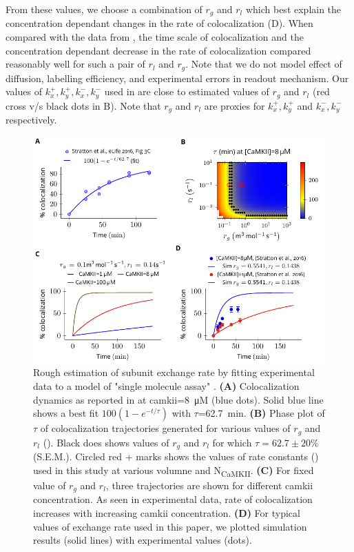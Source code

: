 \documentclass[9pt,lineno,doublespacing]{elife}
\newcommand\SUB[2]{#1\textsubscript{#2}}
\begin{document}
From these values, we choose a combination of $r_g$ and $r_l$ which best explain
the concentration dependant changes in the rate of colocalization
(D).  When compared with the data from
\cite{stratton_activation-triggered_2014}, the time scale of colocalization and
the concentration dependant decrease in the rate of colocalization compared
reasonably well for such a pair of $r_l$ and $r_g$. Note that we do not model
effect of diffusion, labelling efficiency, and experimental errors in readout
mechanism.  Our values of $k_x^+, k_y^+, k_x^-, k_y^-$ used in 
are close to estimated values of $r_g$ and $r_l$ (red cross v/s black dots in
B). Note that $r_g$ and $r_l$ are proxies for
$k_x^+,k_y^+$ and $k_x^-, k_y^-$ respectively.

\begin{figure}[ht!]
    \includegraphics[width=0.95\linewidth]{./PaperFigures/elifeFigure8/figure_exchange_rate.pdf}
    \caption{Rough estimation of subunit exchange rate by fitting experimental
        data to a model of "single molecule assay" \cite{stratton_activation-triggered_2014}. 
        \textbf{(A)} Colocalization
        dynamics as reported in \cite{stratton_activation-triggered_2014} at
        \gls{camkii}=\SI{8}{\micro M} (blue dots). Solid blue line shows a best
        fit $100(1-e^{-t/\tau})$ with $\tau$=\SI{62.7}{min}. \textbf{(B)} Phase
        plot of $\tau$ of colocalization trajectories generated for various
        values of $r_g$ and $r_l$ (). Black does shows values
        of $r_g$ and $r_l$ for which $\tau=62.7\pm 20\%$ (S.E.M.). Circled red +
        marks shows the values of rate constants () used in this 
        study at various volumne and \SUB{N}{CaMKII}. \textbf{(C)} For fixed value of $r_g$ and
        $r_l$, three trajectories are shown for different \gls{camkii}
        concentration. As seen in experimental data, rate of colocalization
        increases with increasing \gls{camkii} concentration. \textbf{(D)} For
        typical values of exchange rate used in this paper, we plotted
        simulation results (solid lines) with experimental values (dots).
    }\label{fig:estimate_of_exchange_rate}
\end{figure}
\end{document}

